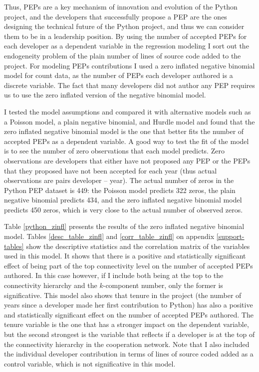 Thus, PEPs are a key mechanism of innovation and evolution of the Python project, and the developers that successfully propose a PEP are the ones designing the technical future of the Python project, and thus we can consider them to be in a leadership position. By using the number of accepted PEPs for each developer as a dependent variable in the regression modeling I sort out the endogeneity problem of the plain number of lines of source code added to the project. For modeling PEPs contributions I used a zero inflated negative binomial model for count data, as the number of PEPs each developer authored is a discrete variable. The fact that many developers did not author any PEP requires us to use the zero inflated version of the negative binomial model.

I tested the model assumptions and compared it with alternative models such as a Poisson model, a plain negative binomial, and Hurdle model and found that the zero inflated negative binomial model is the one that better fits the number of accepted PEPs as a dependent variable. A good way to test the fit of the model is to see the number of zero observations that each model predicts. Zero observations are developers that either have not proposed any PEP or the PEPs that they proposed have not been accepted for each year (thus actual observations are pairs developer -- year). The actual number of zeros in the Python PEP dataset is 449: the Poisson model predicts 322 zeros, the plain negative binomial predicts 434, and the zero inflated negative binomial model predicts 450 zeros, which is very close to the actual number of observed zeros.

Table \ref{python_zinfl} presents the results of the zero inflated negative binomial model. Tables \ref{desc_table_zinfl} and \ref{corr_table_zinfl} on appendix \ref{support-tables} show the descriptive statistics and the correlation matrix of the variables used in this model. It shows that there is a positive and statistically significant effect of being part of the top connectivity level on the number of accepted PEPs authored. In this case however, if I include both being at the top to the connectivity hierarchy and the $k$-component number, only the former is significative. This model also shows that tenure in the project (the number of years since a developer made her first contribution to Python) has also a positive and statistically significant effect on the number of accepted PEPs authored. The tenure variable is the one that has a stronger impact on the dependent variable, but the second strongest is the variable that reflects if a developer is at the top of the connectivity hierarchy in the cooperation network. Note that I also included the individual developer contribution in terms of lines of source coded added as a control variable, which is not significative in this model. 


